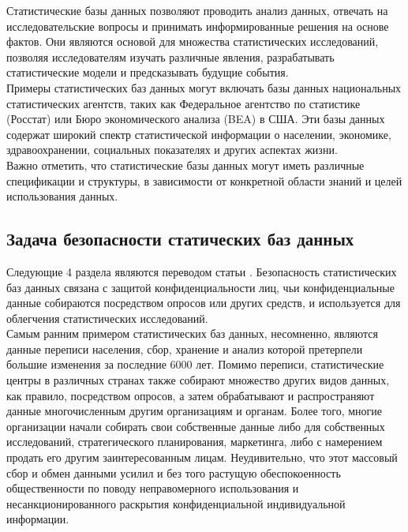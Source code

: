 Статистические базы данных позволяют проводить анализ данных, отвечать на исследовательские вопросы и принимать информированные решения на основе фактов. Они являются основой для множества статистических исследований, позволяя исследователям изучать различные явления, разрабатывать статистические модели и предсказывать будущие события.
\\

Примеры статистических баз данных могут включать базы данных национальных статистических агентств, таких как Федеральное агентство по статистике (Росстат) или Бюро экономического анализа (BEA) в США. Эти базы данных содержат широкий спектр статистической информации о населении, экономике, здравоохранении, социальных показателях и других аспектах жизни.
\\

Важно отметить, что статистические базы данных могут иметь различные спецификации и структуры, в зависимости от конкретной области знаний и целей использования данных.

\subsection{Задача безопасности статических баз данных}
Следующие 4 раздела являются переводом статьи \cite{brankovic2007statistical}.
Безопасность статистических баз данных связана с защитой конфиденциальности лиц, чьи конфиденциальные данные собираются посредством опросов или других средств, и
используется для облегчения статистических исследований. 
\\

Самым ранним примером статистических баз данных, несомненно, являются данные переписи населения,
сбор, хранение и анализ которой претерпели большие изменения
за последние 6000 лет. Помимо переписи, статистические центры 
в различных странах также собирают множество других видов данных, как правило, посредством опросов, а затем обрабатывают и распространяют данные многочисленным другим организациям и органам. Более того, многие организации начали собирать свои собственные данные либо для собственных исследований, стратегического планирования, маркетинга, либо с намерением продать его другим заинтересованным лицам. Неудивительно, что этот массовый сбор и обмен данными усилил и без того растущую обеспокоенность общественности по поводу неправомерного использования и несанкционированного раскрытия конфиденциальной индивидуальной информации.
\\

